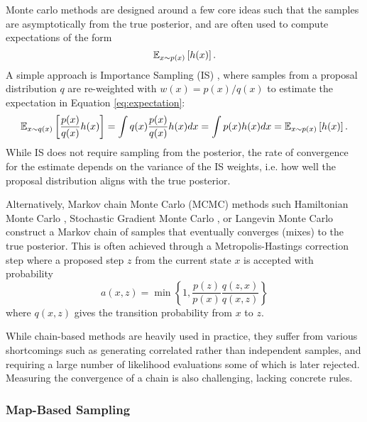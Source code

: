 Monte carlo methods are designed around a few core ideas such that the samples are asymptotically from the true posterior, and are often used to compute expectations of the form
\begin{equation} \label{eq:expectation}
    \mathbb{E}_{x \sim p(x)} \left[ h(x) \right].
\end{equation}
A simple approach is Importance Sampling (IS) \citep{kahnMethodsReducingSample1953}, where samples from a proposal distribution $q$ are re-weighted with $w(x) = p(x)/q(x)$ to estimate the expectation in Equation \ref{eq:expectation}:
\begin{equation}
    \mathbb{E}_{x \sim q(x)} \left[ \frac{p(x)}{q(x)} h(x) \right]
    = \int q(x) \frac{p(x)}{q(x)} h(x) dx = \int p(x)h(x) dx = \mathbb{E}_{x \sim p(x)} \left[ h(x) \right].
\end{equation}
While IS does not require sampling from the posterior, the rate of convergence for the estimate depends on the variance of the IS weights, i.e. how well the proposal distribution aligns with the true posterior. 

Alternatively, Markov chain Monte Carlo (MCMC) methods such Hamiltonian Monte Carlo \citep{nealMCMCUsingHamiltonian2011}, Stochastic Gradient Monte Carlo \citep{maCompleteRecipeStochastic2015}, or Langevin Monte Carlo \citep{robertsExponentialConvergenceLangevin1996} construct a Markov chain of samples that eventually converges (mixes) to the true posterior. This is often achieved through a Metropolis-Hastings correction step \citep{metropolisEquationStateCalculations1953,hastingsMonteCarloSampling1970} where a proposed step $z$ from the current state $x$ is accepted with probability 
\begin{equation}
    a(x,z) = \min \left\{ 1, \frac{p(z)}{p(x)} \frac{q(z,x)}{q(x,z)} \right\}
\end{equation}
where $q(x, z)$ gives the transition probability from $x$ to $z$. 

While chain-based methods are heavily used in practice, they suffer from various shortcomings such as generating correlated rather than independent samples, and requiring a large number of likelihood evaluations some of which is later rejected. Measuring the convergence of a chain is also challenging, lacking concrete rules. 

\subsubsection{Map-Based Sampling}

